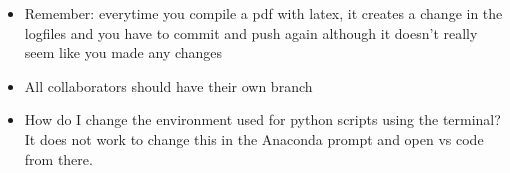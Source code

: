 \documentclass{article}
\begin{document}
    \begin{itemize}
        \item Remember: everytime you compile a pdf with latex, it creates a 
        change in the logfiles and you have to commit and push again although 
        it doesn't really seem like you made any changes
        \item All collaborators should have their own branch
        \item How do I change the environment used for python scripts using 
        the terminal? It does not work to change this in the Anaconda prompt 
        and open vs code from there. 
    \end{itemize}
\end{document}
